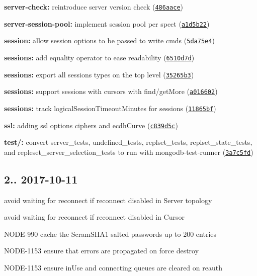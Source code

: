 \begin{DoxyItemize}
\item {\bfseries server-\/check\+:} reintroduce server version check (\href{https://github.com/christkv/mongodb-core/commit/486aace}{\tt 486aace})
\item {\bfseries server-\/session-\/pool\+:} implement session pool per spect (\href{https://github.com/christkv/mongodb-core/commit/a1d5b22}{\tt a1d5b22})
\item {\bfseries session\+:} allow {\ttfamily session} options to be passed to write cmds (\href{https://github.com/christkv/mongodb-core/commit/5da75e4}{\tt 5da75e4})
\item {\bfseries sessions\+:} add equality operator to ease readability (\href{https://github.com/christkv/mongodb-core/commit/6510d7d}{\tt 6510d7d})
\item {\bfseries sessions\+:} export all sessions types on the top level (\href{https://github.com/christkv/mongodb-core/commit/35265b3}{\tt 35265b3})
\item {\bfseries sessions\+:} support sessions with cursors with find/get\+More (\href{https://github.com/christkv/mongodb-core/commit/a016602}{\tt a016602})
\item {\bfseries sessions\+:} track {\ttfamily logical\+Session\+Timeout\+Minutes} for sessions (\href{https://github.com/christkv/mongodb-core/commit/11865bf}{\tt 11865bf})
\item {\bfseries ssl\+:} adding ssl options ciphers and ecdh\+Curve (\href{https://github.com/christkv/mongodb-core/commit/c839d5c}{\tt c839d5c})
\item {\bfseries test/\+:} convert server\+\_\+tests, undefined\+\_\+tests, replset\+\_\+tests, replset\+\_\+state\+\_\+tests, and repleset\+\_\+server\+\_\+selection\+\_\+tests to run with mongodb-\/test-\/runner (\href{https://github.com/christkv/mongodb-core/commit/3a7c5fd}{\tt 3a7c5fd})
\end{DoxyItemize}

\subsection*{2.. 2017-\/10-\/11 }


\begin{DoxyItemize}
\item avoid waiting for reconnect if reconnect disabled in Server topology
\item avoid waiting for reconnect if reconnect disabled in Cursor
\item N\+O\+D\+E-\/990 cache the Scram\+S\+H\+A1 salted passwords up to 200 entries
\item N\+O\+D\+E-\/1153 ensure that errors are propagated on force destroy
\item N\+O\+D\+E-\/1153 ensure in\+Use and connecting queues are cleared on reauth
\end{DoxyItemize}

